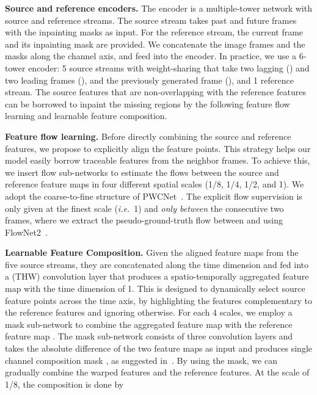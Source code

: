 \documentclass[10pt,twocolumn,letterpaper]{article}
\renewcommand{\paragraph}[1]{\vspace{1mm}\noindent\textbf{#1}}
\renewcommand{\ie}{\textit{i.e.}}
\begin{document}
\paragraph{Source and reference encoders.} 
The encoder is a multiple-tower network with source and reference streams. The source stream takes past and future frames with the inpainting masks as input. For the reference stream, the current frame and its inpainting mask are provided. We concatenate the image frames and the masks along the channel axis, and feed into the encoder.
In practice, we use a 6-tower encoder: 5 source streams with weight-sharing that take two lagging () and two leading frames (), and the previously generated frame (), and 1 reference stream. The source features that are non-overlapping with the reference features can be borrowed to inpaint the missing regions by the following feature flow learning and learnable feature composition.

\paragraph{Feature flow learning.}
Before directly combining the source and reference features, we propose to explicitly align the feature points. This strategy helps our model easily borrow traceable features from the neighbor frames. To achieve this, we insert flow sub-networks to estimate the flows between the source and reference feature maps in four different spatial scales (1/8, 1/4, 1/2, and 1). We adopt the coarse-to-fine structure of PWCNet~\cite{sun2018pwc}. The explicit flow supervision is only given at the finest scale (\ie~1) and \textit{only between} the consecutive two frames, where we extract the pseudo-ground-truth flow  between  and   using FlowNet2~\cite{ilg2017flownet}. 


\paragraph{Learnable Feature Composition.} 
Given the aligned feature maps from the five source streams, they are concatenated along the time dimension and fed into a  (THW) convolution layer that produces a spatio-temporally aggregated feature map  with the time dimension of 1. This is designed to dynamically select source feature points across the time axis, by highlighting the features complementary to the reference features and ignoring otherwise. For each 4 scales, we employ a mask sub-network to combine the aggregated feature map  with the reference feature map . The mask sub-network consists of three convolution layers and takes the absolute difference of the two feature maps  as input and produces single channel composition mask , as suggested in~\cite{chen2017coherent}. By using the mask, we can gradually combine the warped features and the reference features. At the scale of 1/8, the composition is done by 
\end{document}
